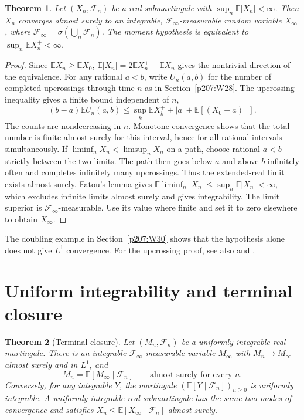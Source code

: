 \documentclass[11pt,oneside,openany]{book}
\theoremstyle{plain}
\newtheorem{theorem}{Theorem}[chapter]
\theoremstyle{definition}
\theoremstyle{remark}
\begin{document}
\begin{theorem}
Let \((X_n,\mathcal F_n)\) be a real submartingale with
\(\sup_n\mathbb E|X_n|<\infty\). Then \(X_n\) converges almost surely
to an integrable, \(\mathcal F_\infty\)-measurable random variable
\(X_\infty\), where
\(\mathcal F_\infty=\sigma(\bigcup_n\mathcal F_n)\).
The moment hypothesis is equivalent to
\(\sup_n\mathbb E X_n^+<\infty\).
\end{theorem}

\begin{proof}
Since \(\mathbb EX_n\ge\mathbb EX_0\),
\(\mathbb E|X_n|=2\mathbb EX_n^+-\mathbb EX_n\)
gives the nontrivial direction of the equivalence.
For any rational \(a<b\), write \(U_n(a,b)\) for the number
of completed upcrossings through time \(n\) as in
Section~\ref{p207:W28}. The upcrossing inequality gives a finite
bound independent of \(n\),
\[
 (b-a)\mathbb E U_n(a,b)
 \le \sup_k\mathbb E X_k^++|a|+\mathbb E[(X_0-a)^-].
\]
The counts are nondecreasing in \(n\). Monotone convergence
shows that the total number is finite almost surely for this
interval, hence for all rational intervals simultaneously.
If \(\liminf_n X_n<\limsup_n X_n\) on a path, choose rational
\(a<b\) strictly between the two limits. The path then goes below
\(a\) and above \(b\) infinitely often and completes infinitely
many upcrossings. Thus the extended-real limit exists almost
surely. Fatou's lemma gives
\(\mathbb E\liminf_n|X_n|\le\sup_n\mathbb E|X_n|<\infty\),
which excludes infinite limits almost surely and gives
integrability. The limit superior is \(\mathcal F_\infty\)-measurable.
Use its value where finite and set it to zero elsewhere to obtain
\(X_\infty\).
\end{proof}

\noindent
The doubling example in Section~\ref{p207:W30} shows that the
hypothesis alone does not give \(L^1\) convergence.
For the upcrossing proof, see also
\cite[Sections 11.2--11.5]{Williams} and
\cite[Theorem 9.19]{Kallenberg}.

\section{Uniform integrability and terminal closure}
\label{p207:W34}

\begin{theorem}[Terminal closure]
Let \((M_n,\mathcal F_n)\) be a uniformly integrable real martingale.
There is an integrable \(\mathcal F_\infty\)-measurable variable
\(M_\infty\) with \(M_n\to M_\infty\) almost surely and in \(L^1\), and
\[
 M_n=\mathbb E[M_\infty\mid\mathcal F_n]
 \qquad\text{almost surely for every }n.
\]
Conversely, for any integrable \(Y\), the martingale
\((\mathbb E[Y\mid\mathcal F_n])_{n\ge0}\) is uniformly integrable.
A uniformly integrable real submartingale has the same two modes of
convergence and satisfies
\(X_n\le\mathbb E[X_\infty\mid\mathcal F_n]\) almost surely.
\end{theorem}
\end{document}
